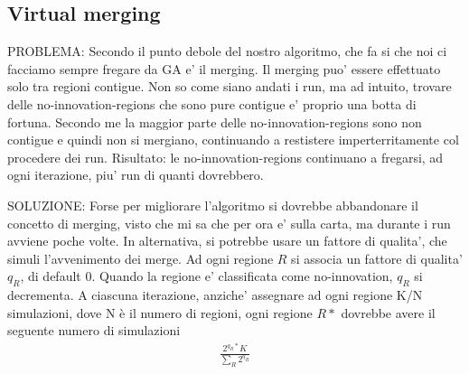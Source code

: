 \subsection{Virtual merging}
PROBLEMA: Secondo il punto debole del nostro algoritmo, che fa si che noi ci facciamo sempre fregare da GA e' il merging. Il merging puo' essere effettuato solo tra regioni contigue. Non so come siano andati i run, ma ad intuito, trovare delle no-innovation-regions che sono pure contigue e' proprio una botta di fortuna. Secondo me la maggior parte delle no-innovation-regions sono non contigue e quindi non si mergiano, continuando a restistere imperterritamente col procedere dei run. Risultato: le no-innovation-regions continuano a fregarsi, ad ogni iterazione, piu' run di quanti dovrebbero.

SOLUZIONE: Forse per migliorare l'algoritmo si dovrebbe abbandonare il concetto di merging, visto che mi sa che per ora e' sulla carta, ma durante i run avviene poche volte. In alternativa, si potrebbe usare un fattore di qualita', che simuli l'avvenimento dei merge. Ad ogni regione $R$ si associa un fattore di qualita' $q_R$, di default 0. Quando la regione e' classificata come no-innovation, $q_R$ si decrementa. A ciascuna iterazione, anziche' assegnare ad ogni regione K/N simulazioni, dove N è il numero di regioni, ogni regione $R*$ dovrebbe avere il seguente numero di simulazioni
	\begin{align}
    \frac{2^{q_R*} K} { \sum_R  2^{q_R} }
	\end{align}

